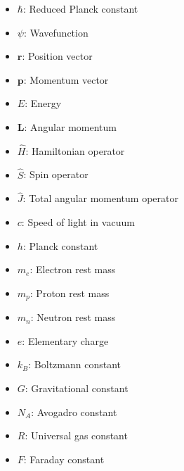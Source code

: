 \documentclass[class=book, crop=false]{standalone}
\begin{document}
\begin{itemize}
    \item $\hbar$: Reduced Planck constant
    \item $\psi$: Wavefunction
    \item $\mathbf{r}$: Position vector
    \item $\mathbf{p}$: Momentum vector
    \item $E$: Energy
    \item $\mathbf{L}$: Angular momentum
    \item $\hat{H}$: Hamiltonian operator
    \item $\hat{S}$: Spin operator
    \item $\hat{J}$: Total angular momentum operator
    \item $c$: Speed of light in vacuum
    \item $h$: Planck constant
    \item $m_e$: Electron rest mass
    \item $m_p$: Proton rest mass
    \item $m_n$: Neutron rest mass
    \item $e$: Elementary charge
    \item $k_B$: Boltzmann constant
    \item $G$: Gravitational constant
    \item $N_A$: Avogadro constant
    \item $R$: Universal gas constant
    \item $F$: Faraday constant
\end{itemize}
\end{document}
